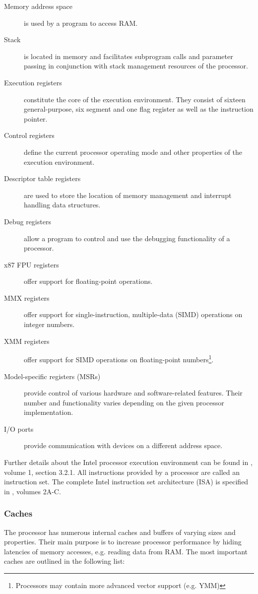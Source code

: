 \begin{description}
	\item[Memory address space] is used by a program to access RAM.
	\item[Stack] is located in memory and facilitates subprogram calls and
		parameter passing in conjunction with stack management resources of the
		processor.
	\item[Execution registers] constitute the core of the execution environment.
		They consist of sixteen general-purpose, six segment and one flag
		register as well as the instruction pointer.
	\item[Control registers] define the current processor operating mode and
		other properties of the execution environment.
	\item[Descriptor table registers] are used to store the location of memory
		management and interrupt handling data structures.
	\item[Debug registers] allow a program to control and use the debugging
		functionality of a processor.
	\item[x87 FPU registers] offer support for floating-point operations.
	\item[MMX registers] offer support for single-instruction, multiple-data
		(SIMD) operations on integer numbers.
	\item[XMM registers] offer support for SIMD operations on floating-point
		numbers\footnote{Processors may contain more advanced vector support
		(e.g. YMM)}.
	\item[Model-specific registers (MSRs)] provide control of various hardware
		and software-related features. Their number and functionality varies
		depending on the given processor implementation.
	\item[I/O ports] provide communication with devices on a different address
		space.
\end{description}

Further details about the Intel processor execution environment can be found in
\cite{IntelSDM}, volume 1, section 3.2.1. All instructions provided by a
processor are called an instruction set. The complete Intel instruction set
architecture (ISA) is specified in \cite{IntelSDM}, volumes 2A-C.

\subsubsection{Caches}
The processor has numerous internal caches and buffers of varying
sizes and properties. Their main purpose is to increase processor performance
by hiding latencies of memory accesses, e.g. reading data from RAM. The most
important caches are outlined in the following list:

